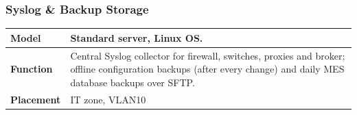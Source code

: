 \subsubsection{Syslog \& Backup Storage}
\renewcommand{\arraystretch}{1.3} %
\begin{tabularx}{\textwidth}{>{\bfseries}p{2.5cm} X}
    \toprule
    Model & Standard server, Linux OS. \\
    \midrule
    Function & Central Syslog collector for firewall, switches, proxies and broker; offline configuration backups (after every change) and daily MES database backups over SFTP.\\
    \midrule
    Placement & IT zone, VLAN10\\
    \midrule
\end{tabularx}

